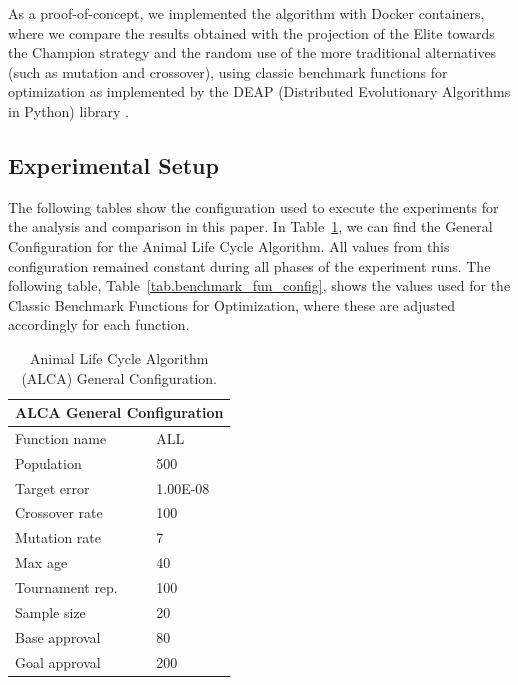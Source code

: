\documentclass[graybox]{svmult}
\begin{document}
    As a proof-of-concept, we implemented the algorithm with Docker containers,
    where we compare the results obtained with the projection of the Elite towards
    the Champion strategy and the random use of the more traditional alternatives
    (such as mutation and crossover), using classic benchmark functions for
    optimization as implemented by the DEAP (Distributed Evolutionary Algorithms in
    Python) library \cite{fortin2012deap}.

    \subsection{Experimental Setup} 

        The following tables show the configuration used to execute the experiments for
        the analysis and comparison in this paper. In
        Table~\ref{tab.general_configuration}, we can find the General Configuration
        for the Animal Life Cycle Algorithm. All values from this configuration
        remained constant during all phases of the experiment runs. The following
        table, Table~\ref{tab.benchmark_fun_config}, shows the values used for the
        Classic Benchmark Functions for Optimization, where these are adjusted
        accordingly for each function.

        \begin{table}[]
            \scriptsize
            \centering
            \caption{Animal Life Cycle Algorithm (ALCA) General Configuration.}\label{tab.general_configuration}
            \begin{tabular}{@{}ll@{}}
            \toprule
            \multicolumn{2}{l}{\textbf{ALCA General Configuration}} \\ \midrule
            Function name & ALL \\
            Population & 500 \\
            Target error & 1.00E-08 \\
            Crossover rate & 100 \\
            Mutation rate & 7 \\
            Max age & 40 \\
            Tournament rep. & 100 \\
            Sample size & 20 \\
            Base approval & 80 \\
            Goal approval & 200 \\ \bottomrule
            \end{tabular}
            \end{table}
\end{document}
